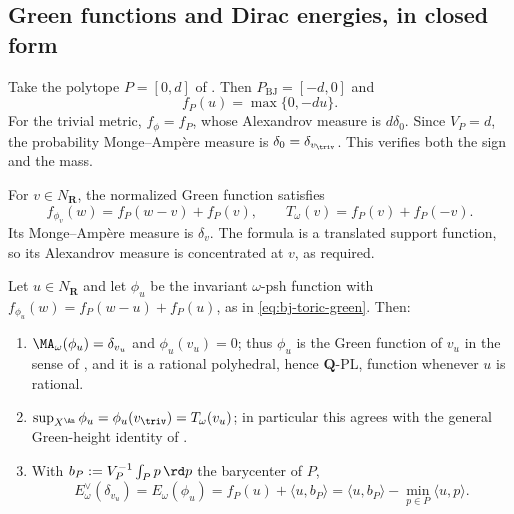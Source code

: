 \subsection{Green functions and Dirac energies, in closed form}
\label{sec:ch49-toric-green}

\begin{example}[$\mathbf P^1$]
\label{ex:ch49-toric-trivial-p1}
Take the polytope $P=[0,d]$ of .  Then
$P_{\mathrm{BJ}}=[-d,0]$ and
\[
 f_P(u)=\max\{0,-du\}.
\]
For the trivial metric, $f_\phi=f_P$, whose Alexandrov measure is
$d\delta_0$.  Since $V_P=d$, the probability Monge--Amp\`ere measure is
$\delta_0=\delta_{v_{\triv}}$.  This verifies both the sign and the mass.
\end{example}

\begin{example}
\label{ex:ch49-toric-green-formula}
For $v\in N_{\mathbf R}$, the normalized Green function satisfies
\[
 f_{\phi_v}(w)=f_P(w-v)+f_P(v),
\qquad
 T_\omega(v)=f_P(v)+f_P(-v).
\tag{49.34}\label{eq:bj-toric-green}
\]
Its Monge--Amp\`ere measure is $\delta_v$.  The formula is a translated
support function, so its Alexandrov measure is concentrated at $v$, as
required.
\end{example}

\begin{proposition}
\label{prop:ch49-toric-green}
Let $u\in N_{\mathbf R}$ and let $\phi_u$ be the invariant
$\omega$-psh function with $f_{\phi_u}(w)=f_P(w-u)+f_P(u)$, as in
\eqref{eq:bj-toric-green}.  Then:
\begin{enumerate}
\item\label{itm:ch49-tg:ma}
      $\MA_\omega(\phi_u)=\delta_{v_u}$ and $\phi_u(v_u)=0$; thus
      $\phi_u$ is the Green function of $v_u$ in the sense of
      , and it is a rational polyhedral, hence
      $\mathbf Q$-PL, function whenever $u$ is rational.
\item\label{itm:ch49-tg:sup}
      $\sup_{X^{\An}}\phi_u=\phi_u(v_{\triv})=T_\omega(v_u)$; in
      particular this agrees with the general Green-height identity of
      .
\item\label{itm:ch49-tg:energy}
      With $b_P:=V_P^{-1}\int_Pp\,\rd p$ the barycenter of $P$,
      \[
       E^\vee_\omega(\delta_{v_u})=E_\omega(\phi_u)
       =f_P(u)+\langle u,b_P\rangle
       =\langle u,b_P\rangle-\min_{p\in P}\langle u,p\rangle .
      \tag{49.35}\label{eq:ch49-toric-dirac-energy}
      \]
\end{enumerate}
\end{proposition}

